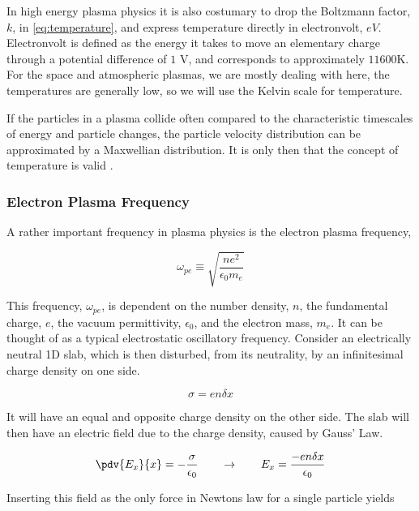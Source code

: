 		In high energy plasma physics it is also costumary to drop the Boltzmann factor, \(k\),
		in \cref{eq:temperature}, and express temperature directly in electronvolt, \(eV\).
		Electronvolt is defined as the energy it takes to move an elementary charge through
		a potential difference of \(1\) \si{\volt}, and corresponds to approximately
		\(11600 \si{\kelvin}\). For the space and atmospheric plasmas, we are mostly
		dealing with here, the temperatures are generally low, so we will use the Kelvin scale
		for temperature.

		If the particles in a plasma collide often compared to the characteristic timescales
		of energy and particle changes, the particle velocity distribution can be approximated
		by a Maxwellian distribution. It is only then that the concept of
		temperature is valid \citep{goldston_introduction_1995}.

		\subsubsection{Electron Plasma Frequency}
		A rather important frequency in plasma physics is the electron plasma frequency,

		\begin{equation}
			\omega_{pe} \equiv \sqrt{\frac{ne^2}{\epsilon_0 m_e}}
		\end{equation}

		This frequency, \(\omega_{pe}\), is dependent on the number density, \(n\),
		the fundamental charge, \(e\), the vacuum permittivity, \(\epsilon_0\), and
		the electron mass, \(m_e\).
		It can be thought of as a typical electrostatic oscillatory frequency.
		Consider an electrically neutral 1D slab, which is then disturbed, from its
		neutrality, by an infinitesimal charge density on one side.

		\begin{equation}
			\sigma = en\delta x
		\end{equation}

		It will have an equal and opposite charge density on the other side. The slab
		will then have an electric field due to the charge density, caused by Gauss' Law.

		\begin{equation}
			\pdv{E_x}{x} = -\frac{\sigma}{\epsilon_0} \qquad\rightarrow\qquad
			E_x = \frac{-en\delta x}{\epsilon_0}
		\end{equation}

		Inserting this field as the only force in Newtons law for a single particle yields

